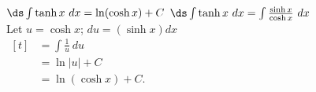 {$\ds \int \tanh x\ dx  = \ln (\cosh x) + C$}
{$\ds	\int \tanh x\ dx = \int \frac{\sinh x}{\cosh x}\ dx$\\
Let $u = \cosh x$; $du = (\sinh x) dx$\\
\hfill$\begin{aligned}[t]
											&= \int \frac{1}{u}\ du \\
											&= \ln |u| + C \\
											&= \ln (\cosh x) + C.
\end{aligned}$\hfill\null}
